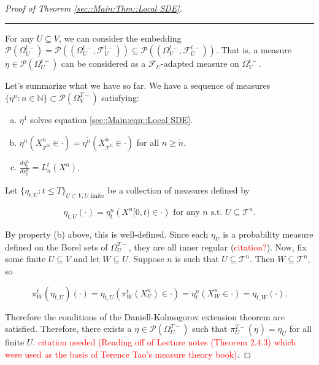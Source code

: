 \documentclass[12pt]{article}
\newcommand{\mb}{\mathbb}
\newcommand{\mc}{\mathcal}
\newcommand{\ms}{\mathscr}
\newcommand{\te}{\text}
\newcommand{\tr}{\textcolor{red}}
\newcommand{\ind}{\hspace{24pt}}
\newcommand{\lin}{\rule{\linewidth}{0.4 pt}}
\newcommand{\pmsr}{\mc{P}}							%
\renewcommand{\U}{U}							%
\newcommand{\UU}{W}								%
\newcommand{\T}{T}								%
\newcommand{\OmegaV}[2]{\Omega_{#1}^{#2}}		%
\renewcommand{\t}{t}							%
\newcommand{\pup}[1]{^{#1}}							%
\newcommand{\tree}{\mc{T}}							%
\newcommand{\V}{V}									%
\newcommand{\numb}{n}								%
\newcommand{\piV}[2]{\pi_{#1}^{#2}}					%
\newcommand{\rxvtsn}[3]{X_{#1}^{#3}{#2}}			%
\newcommand{\mm}[3]{\nu_{#2#1}^{#3}}						%
\newcommand{\mmm}[3]{\eta_{#2#1}^{#3}}						%
\newcommand{\F}[2]{\mc{F}_{#1}^{#2}}				%
\newcommand{\alt}{\widetilde}						%
\newcommand{\dense}[2]{L_{#1}^{#2}}				%
\begin{document}
\begin{proof}[Proof of Theorem \ref{sec::Main:Thm::Local SDE}]
\lin

For any \(\U\subseteq \V\), we can consider the embedding \(\pmsr\left(\OmegaV{\U}{\t-}\right) = \pmsr\left((\OmegaV{\U}{\t-},\F{\U}{\t-})\right) \subseteq \pmsr\left((\OmegaV{\V}{\t-},\F{\U}{\t-})\right)\). That is, a measure \(\mmm{}{}{}\in \pmsr\left(\OmegaV{\U}{\t-}\right)\) can be considered as a \(\F{\U}{}\)-adapted measure on \(\OmegaV{\V}{\t-}\).

\ind Let's summarize what we have so far. We have a sequence of measures \(\{\mmm{}{}{\numb}:\numb\in\mb{N}\} \subset \pmsr(\OmegaV{\V}{\T-})\) satisfying:

\begin{enumerate}[(a)]
\item \(\mmm{}{}{1}\) solves equation \eqref{sec::Main:eqn::Local SDE}.

\item \(\mmm{}{}{\numb}(\rxvtsn{\tree\pup{\alt{\numb}}}{}{\numb} \in \cdot) = \mmm{}{}{\alt{\numb}}(\rxvtsn{\tree\pup{\alt{\numb}}}{}{\alt{\numb}}\in \cdot)\) for all \(\numb \geq \alt{\numb}\).

\item \(\frac{d\mmm{}{\t}{\numb}}{d\mm{}{\t}{\numb}} = \dense{\numb}{\t}(\rxvtsn{}{}{\numb})\).
\end{enumerate}

Let \(\{\mmm{\U}{\t,}{}:\t \leq \T\}_{\U\subset \V,\U\te{ finite}}\) be a collection of measures defined by

\[\mmm{\U}{\t,}{}(\cdot) = \mmm{}{\t}{\numb}(\rxvtsn{}{[0,\t)}{\numb} \in \cdot) \te{ for any }\numb\te{ s.t. }\U \subseteq \tree\pup{\numb}.\]

By property (b) above, this is well-defined. Since each \(\mmm{\U}{}{}\) is a probability measure defined on the Borel sets of \(\OmegaV{\U}{\T-}\), they are all inner regular (\tr{citation?}). Now, fix some finite \(\U\subseteq \V\) and let \(\UU \subseteq \U\). Suppose \(\numb\) is such that \(\U \subseteq \tree\pup{\numb}\). Then \(\UU\subseteq \tree\pup{\numb}\), so

\[\piV{\UU}{\t}(\mmm{\U}{\t,}{})(\cdot) = \mmm{\U}{\t,}{}\left(\piV{\UU}{\t}(\rxvtsn{\U}{}{\numb}) \in \cdot\right) = \mmm{}{\t}{\numb}\left(\rxvtsn{\UU}{}{\numb} \in \cdot\right) = \mmm{\UU}{\t,}{}(\cdot).\]

Therefore the conditions of the Daniell-Kolmogorov extension theorem are satisfied. Therefore, there exists a \(\mmm{}{}{}\in \ms{P}(\OmegaV{\U}{\T-})\) such that \(\piV{\U}{\T-}(\mmm{}{}{}) =\mmm{\U}{}{}\) for all finite \(\U\). \tr{citation needed (Reading off of Lecture notes (Theorem 2.4.3) which were used as the basis of Terence Tao's measure theory book)}.


\end{proof}
\end{document}
